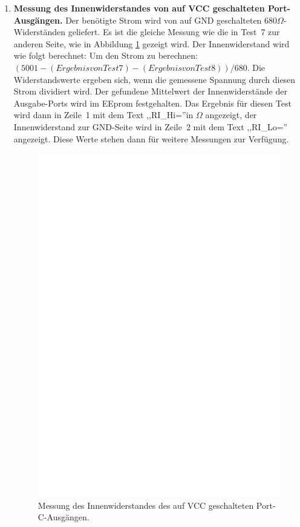 \begin{enumerate}
\item {\bf Messung des Innenwiderstandes von auf VCC geschalteten Port-Ausgängen.}
Der benötigte Strom wird von auf GND geschalteten \(680\Omega\)-Widerständen geliefert.
Es ist die gleiche Messung wie die in Test~7 zur anderen Seite, wie in Abbildung \ref{fig:test8} gezeigt wird.
Der Innenwiderstand wird wie folgt berechnet:
Um den Strom zu berechnen: \((5001 - (Ergebnis von Test 7) - (Ergebnis von Test 8)) / 680\).
Die Widerstandswerte ergeben sich, wenn die gemessene Spannung durch diesen Strom dividiert wird.
Der gefundene Mittelwert der Innenwiderstände der Ausgabe-Ports wird im EEprom festgehalten.
Das Ergebnis für diesen Test wird dann in Zeile~1 mit dem Text ,,RI\_Hi=''in \(\Omega\) angezeigt, der Innenwiderstand
zur GND-Seite wird in Zeile~2 mit dem Text ,,RI\_Lo='' angezeigt.
Diese Werte stehen dann für weitere Messungen zur Verfügung.
\begin{figure}[H]
\centering
\includegraphics[]{../FIG/Test8.eps}
\caption{Messung des Innenwiderstandes des auf VCC geschalteten Port-C-Ausgängen.}
\label{fig:test8}
\end{figure}


\end{enumerate}
